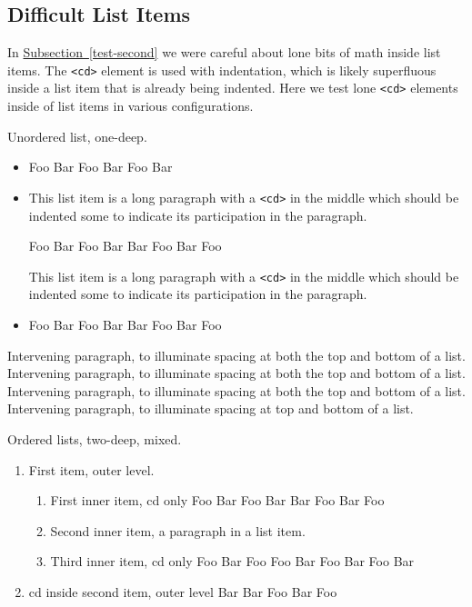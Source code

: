\documentclass{amsart}
\theoremstyle{plain}%
\theoremstyle{definition}%
\theoremstyle{remark}%
\newcommand{\xreffont}{\relax}
\newcommand{\mono}[1]{\texttt{#1}}
\numberwithin{equation}{section}
\begin{document}
\subsection{Difficult List Items}\label{section-lists-6}%
In \hyperref[test-second]{Subsection~{\xreffont\ref{test-second}}} we were careful about lone bits of math inside list items.  The \mono{<cd>} element is used with indentation, which is likely superfluous inside a list item that is already being indented.  Here we test lone \mono{<cd>} elements inside of list items in various configurations.%
\par
Unordered list, one-deep.%
\begin{itemize}[label=\textbullet]
\item{}%
\begin{codedisplayleft}
Foo Bar Foo
Bar Foo Bar
\end{codedisplayleft}
%
\item{}This list item is a long paragraph with a \mono{<cd>} in the middle which should be indented some to indicate its participation in the paragraph.%
\begin{codedisplay}
Foo Bar Foo
Bar
Bar Foo Bar
Foo
\end{codedisplay}
This list item is a long paragraph with a \mono{<cd>} in the middle which should be indented some to indicate its participation in the paragraph.%
\item{}%
\begin{codedisplayleft}
Foo Bar Foo
Bar
Bar Foo Bar
Foo
\end{codedisplayleft}
%
\end{itemize}
%
\par
Intervening paragraph, to illuminate spacing at both the top and bottom of a list.  Intervening paragraph, to illuminate spacing at both the top and bottom of a list.  Intervening paragraph, to illuminate spacing at both the top and bottom of a list.  Intervening paragraph, to illuminate spacing at top and bottom of a list.%
\par
Ordered lists, two-deep, mixed.%
\begin{enumerate}
\item{}First item, outer level.%
\begin{enumerate}
\item{}%
\begin{codedisplayleft}
First inner item, cd only
Foo Bar Foo
Bar
Bar Foo Bar
Foo
\end{codedisplayleft}
%
\item{}Second inner item, a paragraph in a list item.%
\item{}%
\begin{codedisplayleft}
Third inner item, cd only
Foo Bar Foo
Foo Bar Foo
Bar Foo Bar
\end{codedisplayleft}
%
\end{enumerate}
%
\item{}%
\begin{codedisplayleft}
cd inside second item, outer level
Bar
Bar Foo Bar
Foo
\end{codedisplayleft}
%
\end{enumerate}
\end{document}
